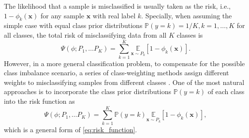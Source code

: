 \documentclass[journal]{IEEEtran}
\begin{document}
The likelihood that a sample is misclassified is usually taken as the risk, i.e., $1-\phi_k(\boldsymbol{x})$ for any sample $\boldsymbol{x}$ with real label $k$. Specially, when assuming the simple case with equal class prior distributions $\mathbb{P}(y=k)=1/K,k=1,\ldots,K$ for all classes, the total risk of misclassifying data from all $K$ classes is 
\begin{equation}
\Psi\left(\phi; P_{1}, \ldots P_{K}\right)=\sum_{k=1}^{K} \underset{\boldsymbol{x} \sim P_{k}}{\mathbb{E}}\left[1-\phi_{k}(\boldsymbol{x})\right].
\label{eq:risk_function}
\end{equation}
However, in a more general classification problem, to compensate for the possible class imbalance scenario, a series of class-weighting methods assign different weights to misclassifying samples from different classes \cite{zhou2005training,scott2012calibrated}.
One of the most natural approaches is to incorporate the class prior distributions $\mathbb{P}(y=k)$ of each class into the risk function \cite{aurelio2019learning,xu2020class} as
\begin{equation}
\Psi\left(\phi; P_{1}, \ldots P_{K}\right)=\sum_{k=1}^{K} \mathbb{P}(y=k) \underset{\boldsymbol{x} \sim P_{k}}{\mathbb{E}}\left[1-\phi_{k}(\boldsymbol{x})\right],
\label{eq:weighted_risk_function}
\end{equation}
which is a general form of \eqref{eq:risk_function}.
\end{document}
